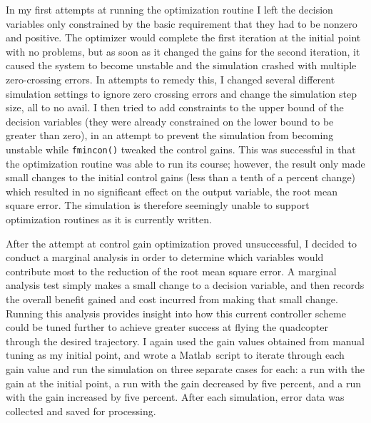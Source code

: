 \documentclass[onecolumn,10pt]{IEEEtran}
\newcommand{\MATLAB}{Matlab}
\begin{document}
In my first attempts at running the optimization routine I left the decision variables only constrained by the basic requirement that they had to be nonzero and positive. The optimizer would complete the first iteration at the initial point with no problems, but as soon as it changed the gains for the second iteration, it caused the system to become unstable and the simulation crashed with multiple zero-crossing errors. In attempts to remedy this, I changed several different simulation settings to ignore zero crossing errors and change the simulation step size, all to no avail. I then tried to add constraints to the upper bound of the decision variables (they were already constrained on the lower bound to be greater than zero), in an attempt to prevent the simulation from becoming unstable while \lstinline{fmincon()} tweaked the control gains. This was successful in that the optimization routine was able to run its course; however, the result only made small changes to the initial control gains (less than a tenth of a percent change) which resulted in no significant effect on the output variable, the root mean square error. The simulation is therefore seemingly unable to support optimization routines as it is currently written.

After the attempt at control gain optimization proved unsuccessful, I decided to conduct a marginal analysis in order to determine which variables would contribute most to the reduction of the root mean square error. A marginal analysis test simply makes a small change to a decision variable, and then records the overall benefit gained and cost incurred from making that small change. Running this analysis provides insight into how this current controller scheme could be tuned further to achieve greater success at flying the quadcopter through the desired trajectory. I again used the gain values obtained from manual tuning as my initial point, and wrote a \MATLAB\ script to iterate through each gain value and run the simulation on three separate cases for each: a run with the gain at the initial point, a run with the gain decreased by five percent, and a run with the gain increased by five percent. After each simulation, error data was collected and saved for processing. 
\end{document}
